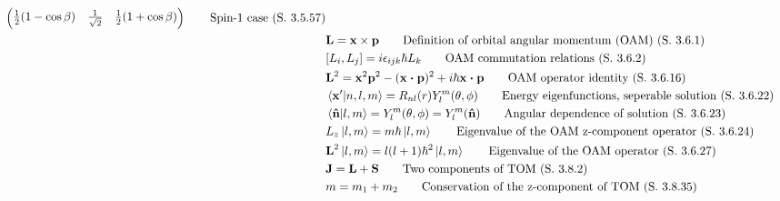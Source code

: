 \documentclass[10pt]{article}
\newcommand{\nhat}{\boldsymbol{\hat{\textbf{n}}}}
\newcommand{\ve}[1]{\boldsymbol{\mathbf{#1}}}
\begin{document}
\begin{multicols}{2}
\begin{align*}
\begin{pmatrix}
			\frac{1}{2}(1-\cos \beta) & \frac{1}{\sqrt{2}} & \frac{1}{2}(1+\cos \beta) \\
		\end{pmatrix}	\tag*{Spin-1 case (S. 3.5.57)}	\\
		& \ve{L} = \ve{x} \times \ve{p}	\tag*{Definition of orbital angular momentum (OAM) (S. 3.6.1)} \\
		& [L_i,L_j] = i \epsilon_{ijk} \hbar L_k	\tag*{OAM commutation relations (S. 3.6.2)} \\
		& \ve{L}^2 = \ve{x}^2 \ve{p}^2 - ( \ve{x \cdot p})^2 + i \hbar \ve{x \cdot p}	\tag*{OAM operator identity (S. 3.6.16)} \\
		& \braket{\ve{x}'}{n,l,m} = R_{nl}(r) Y_l^m (\theta, \phi)	\tag*{Energy eigenfunctions, seperable solution (S. 3.6.22)} \\
		& \braket{\nhat}{l,m} = Y_l^m(\theta,\phi) = Y_l^m(\nhat)	\tag*{Angular dependence of solution (S. 3.6.23)} \\
		& L_z\ket{l,m} = m \hbar \ket{l,m}	\tag*{Eigenvalue of the OAM z-component operator (S. 3.6.24)} \\
		& \ve{L}^2 \ket{l,m} = l(l+1) \hbar^2 \ket{l,m}	\tag*{Eigenvalue of the OAM operator (S. 3.6.27)} \\
		& \ve{J} = \ve{L} + \ve{S}	\tag*{Two components of TOM (S. 3.8.2)} \\
		& m = m_1+m_2	\tag*{Conservation of the z-component of TOM (S. 3.8.35)}
 	\end{align*}
\end{multicols}
 
\end{document}
